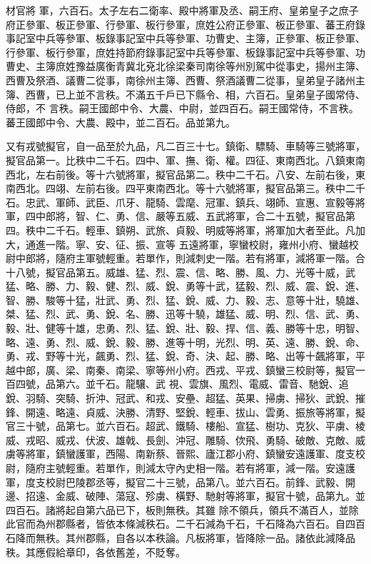 \begin{pinyinscope}
 材官將
 軍，六百石。太子左右二衛率、殿中將軍及丞、嗣王府、皇弟皇子之庶子府正參軍、板正參軍、行參軍、板行參軍，庶姓公府正參軍、板正參軍、蕃王府錄事記室中兵等參軍、板錄事記室中兵等參軍、功曹史、主簿，正參軍、板正參軍、行參軍、板行參軍，庶姓持節府錄事記室中兵等參軍、板錄事記室中兵等參軍、功曹史、主簿庶姓豫益廣衡青冀北兗北徐梁秦司南徐等州別駕中從事史，揚州主簿、西曹及祭酒、議曹二從事，南徐州主簿、西曹、祭酒議曹二從事，皇弟皇子諸州主簿、西曹，已上並不言秩。不滿五千戶已下縣令、相，六百石。皇弟皇子國常侍、侍郎，不
 言秩。嗣王國郎中令、大農、中尉，並四百石。嗣王國常侍，不言秩。蕃王國郎中令、大農、殿中，並二百石。品並第九。



 又有戎號擬官，自一品至於九品，凡二百三十七。鎮衛、驃騎、車騎等三號將軍，擬官品第一。比秩中二千石。四中、軍、撫、衛、權。四征、東南西北。八鎮東南西北，左右前後。等十六號將軍，擬官品第二。秩中二千石。八安、左前右後，東南西北。四翊、左前右後。四平東南西北。等十六號將軍，擬官品第三。秩中二千石。忠武、軍師、武臣、爪牙、龍騎、雲麾、冠軍、鎮兵、翊師、宣惠、宣毅等將軍，四中郎將，智、仁、勇、信、嚴等五威、五武將軍，合二十五號，擬官品第四。秩中二千石。輕車、鎮朔、武旅、貞毅、明威等將軍，將軍加大者至此。凡加大，通進一階。寧、安、征、振、宣等
 五遠將軍，寧蠻校尉，雍州小府、蠻越校尉中郎將，隨府主軍號輕重。若單作，則減刺史一階。若有將軍，減將軍一階。合十八號，擬官品第五。威雄、猛、烈、震、信、略、勝、風、力、光等十威，武猛、略、勝、力、毅、健、烈、威、銳、勇等十武，猛毅、烈、威、震、銳、進、智、勝、駿等十猛，壯武、勇、烈、猛、銳、威、力、毅、志、意等十壯，驍雄、桀、猛、烈、武、勇、銳、名、勝、迅等十驍，雄猛、威、明、烈、信、武、勇、毅、壯、健等十雄，忠勇、烈、猛、銳、壯、毅、捍、信、義、勝等十忠，明智、略、遠、勇、烈、威、銳、毅、勝、進等十明，光烈、明、英、遠、勝、銳、命、勇、戎、野等十光，飆勇、烈、猛、銳、奇、決、起、勝、略、出等十飆將軍，平越中郎，廣、梁、南秦、南梁、寧等州小府。西戎、平戎、鎮蠻三校尉等，擬官一百四號，品第六。並千石。龍驤、武
 視、雲旗、風烈、電威、雷音、馳銳、追銳、羽騎、突騎、折沖、冠武、和戎、安壘、超猛、英果、掃虜、掃狄、武銳、摧鋒、開遠、略遠、貞威、決勝、清野、堅銳、輕車、拔山、雲勇、振旅等將軍，擬官三十號，品第七。並六百石。超武、鐵騎、樓船、宣猛、樹功、克狄、平虜、棱威、戎昭、威戎、伏波、雄戟、長劍、沖冠、雕騎、佽飛、勇騎、破敵、克敵、威虜等將軍，鎮蠻護軍，西陽、南新蔡、晉熙、廬江郡小府、鎮蠻安遠護軍、度支校尉，隨府主號輕重。若單作，則減太守內史相一階。若有將軍，減一階。安遠護軍，度支校尉巴陵郡丞等，擬官二十三號，品第八。並六百石。前鋒、武毅、開邊、招遠、金威、破陣、蕩寇、殄虜、橫野、馳射等將軍，擬官十號，品第九。並四百石。諸將起自第六品已下，板則無秩。其雖
 除不領兵，領兵不滿百人，並除此官而為州郡縣者，皆依本條減秩石。二千石減為千石，千石降為六百石。自四百石降而無秩。其州郡縣，自各以本秩論。凡板將軍，皆降除一品。諸依此減降品秩。其應假給章印，各依舊差，不貶奪。




\end{pinyinscope}
